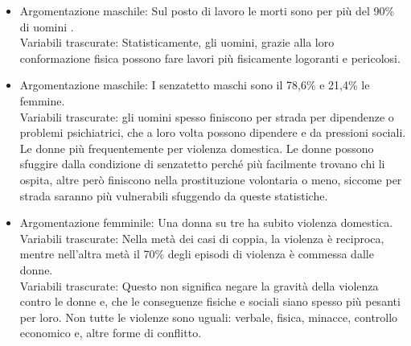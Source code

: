 \documentclass[12pt]{book} %
\begin{document}
\begin{mdframed}[linewidth=1pt]
\begin{itemize}
\item Argomentazione maschile: Sul posto di lavoro le morti sono per più del 90\% di uomini .
\\Variabili trascurate: Statisticamente, gli uomini, grazie alla loro conformazione fisica possono fare lavori più fisicamente logoranti e pericolosi. 
\item Argomentazione maschile: I senzatetto maschi sono il 78,6\% e 21,4\% le femmine.
\\Variabili trascurate: gli uomini spesso finiscono per strada per dipendenze o problemi psichiatrici, che a loro volta possono dipendere e da pressioni sociali. Le donne più frequentemente per violenza domestica. Le donne possono sfuggire dalla condizione di senzatetto perché più facilmente trovano chi li ospita, altre però finiscono nella prostituzione volontaria o meno, siccome per strada saranno più vulnerabili sfuggendo da queste statistiche.
\item Argomentazione femminile: Una donna su tre ha subito violenza domestica. 
\\Variabili trascurate: Nella metà dei casi di coppia, la violenza è reciproca, mentre nell'altra metà il 70\% degli episodi di violenza è commessa dalle donne. 
\\Variabili trascurate: Questo non significa negare la gravità della violenza contro le donne e, che le conseguenze fisiche e sociali siano spesso più pesanti per loro. Non tutte le violenze sono uguali: verbale, fisica, minacce, controllo economico e, altre forme di conflitto. 

\end{itemize}
\end{mdframed}
\end{document}
